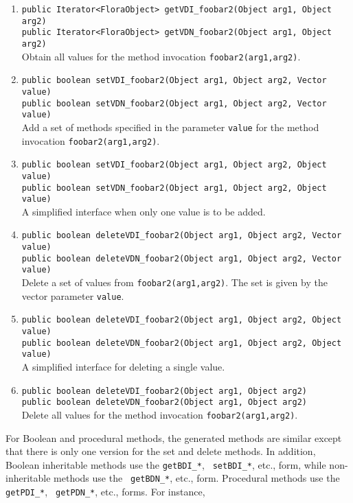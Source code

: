 \begin{enumerate}
\item {\tt public Iterator<FloraObject> getVDI\_foobar2(Object arg1, Object arg2)}\\
  {\tt public Iterator<FloraObject> getVDN\_foobar2(Object arg1, Object arg2)}
  \\
  Obtain all values for the \fl method invocation {\tt foobar2(arg1,arg2)}.
\item {\tt public boolean setVDI\_foobar2(Object arg1, Object arg2, Vector value)}\\
  {\tt public boolean setVDN\_foobar2(Object arg1, Object arg2, Vector value)}
  \\
  Add a set of methods specified in the parameter {\tt value} for the method
  invocation {\tt foobar2(arg1,arg2)}. 
\item {\tt public boolean setVDI\_foobar2(Object arg1, Object arg2, Object value)}\\
  {\tt public boolean setVDN\_foobar2(Object arg1, Object arg2, Object value)}
  \\
  A simplified interface when only one value is to be added.
\item {\tt public boolean deleteVDI\_foobar2(Object arg1, Object arg2, Vector value)}\\
  {\tt public boolean deleteVDN\_foobar2(Object arg1, Object arg2, Vector value)}
  \\
  Delete a set of values from {\tt foobar2(arg1,arg2)}. The set is given by
  the vector parameter {\tt value}. 
\item {\tt public boolean deleteVDI\_foobar2(Object arg1, Object arg2, Object value)}\\
  {\tt public boolean deleteVDN\_foobar2(Object arg1, Object arg2, Object value)}
  \\
  A simplified interface for deleting a single value.
\item {\tt public boolean deleteVDI\_foobar2(Object arg1, Object arg2)}\\
  {\tt public boolean deleteVDN\_foobar2(Object arg1, Object arg2)}
  \\
  Delete all values for the method invocation {\tt foobar2(arg1,arg2)}. 
\end{enumerate}
For Boolean and procedural methods, the generated methods are similar
except that there is only one version for the set and delete methods. In
addition, Boolean inheritable methods use the {\tt getBDI\_*}, {\tt
  setBDI\_*}, etc., form, while non-inheritable methods use the {\tt
  getBDN\_*}, etc., form.  Procedural methods use the {\tt getPDI\_*}, {\tt
  getPDN\_*}, etc., forms.  For instance,
